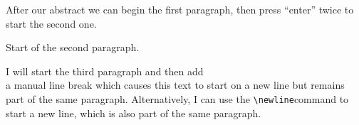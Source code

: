 \documentclass{article}
\begin{document}
\begin{abstract} %
    This is a simple paragraph at the beginning of the
    document. A brief introduction about the main subject.
\end{abstract}

After our abstract we can begin the first paragraph, then press ``enter'' twice
to start the second one.

Start of the second paragraph.

I will start the third paragraph and then add \\ a manual line break which
causes this text to start on a new line but remains part of the same paragraph.
Alternatively, I can use the \verb|\newline|\newline command to start a new
line, which is also part of the same paragraph.

\end{document}
